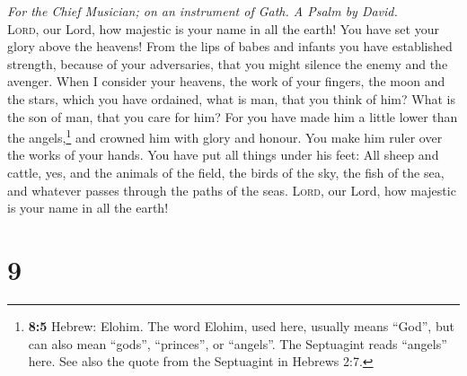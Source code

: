 \emph{For the Chief Musician; on an instrument of Gath. A Psalm by
David.}\\
 \textsc{Lord}, our Lord, how majestic is your name in all
the earth! You have set your glory above the heavens! 
From the lips of babes and infants you have established strength,
because of your adversaries, that you might silence the enemy and the
avenger.  When I consider your heavens, the work of your
fingers, the moon and the stars, which you have ordained, 
what is man, that you think of him? What is the son of man, that you
care for him?  For you have made him a little lower than
the angels,\footnote{\textbf{8:5} Hebrew: Elohim. The word Elohim, used
  here, usually means ``God'', but can also mean ``gods'', ``princes'',
  or ``angels''. The Septuagint reads ``angels'' here. See also the
  quote from the Septuagint in Hebrews 2:7.} and crowned him with glory
and honour.  You make him ruler over the works of your
hands. You have put all things under his feet:  All sheep
and cattle, yes, and the animals of the field,  the birds
of the sky, the fish of the sea, and whatever passes through the paths
of the seas.  \textsc{Lord}, our Lord, how majestic is
your name in all the earth!

\hypertarget{section-8}{%
\section{9}\label{section-8}}

